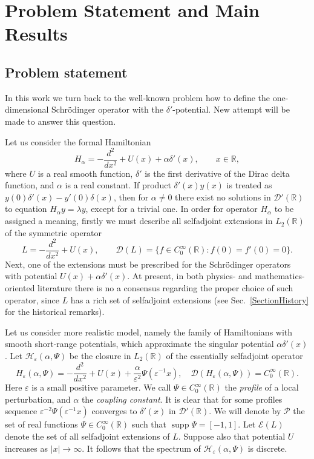 \documentclass[11pt,english]{amsart}%
\DeclareMathOperator{\supp}{supp} \DeclareMathOperator{\sgn}{sgn}
\begin{document}
\section{Problem Statement and Main Results}
\subsection{Problem statement}

In this work we turn back to the well-known problem how to define the one-dimensional Schr\"{o}dinger operator with the $\delta'$-potential. New attempt will be made to answer this question.

Let us consider the formal Hamiltonian
$$H_\alpha=-\frac{d^2}{dx^2}+U(x)+\alpha\delta'(x),\qquad x\in\mathbb R,$$
where $U$ is a real smooth function, $\delta'$ is the first derivative of the Dirac delta function, and $\alpha$ is a real constant. If product $\delta'(x)y(x)$ is treated as  $y(0)\delta'(x)-y'(0)\delta(x)$, then for $\alpha\neq 0$ there exist no solutions in $\mathcal{D}'(\mathbb{R})$ to equation $H_\alpha y=\lambda y$, except for a trivial one.
In order for operator  $H_\alpha$ to be assigned a meaning, firstly we must describe all selfadjoint extensions in
 $L_2(\mathbb{R})$  of the symmetric operator
\begin{equation*}
    L=-\frac{d^2}{dx^2}+U(x),\qquad \mathcal{D}(L)=\{f\in C_0^\infty(\mathbb{R})\colon f(0)=f'(0)=0\}.
\end{equation*}
Next, one of the extensions must be prescribed for the Schr\"{o}dinger operators with potential
$U(x)+\alpha\delta'(x)$.
At present, in both physics- and mathematics-oriented literature there is no a consensus regarding
the pro\-per choice of such operator, since  $L$ has a rich set of selfadjoint extensions (see Sec.~\ref{SectionHistory} for the historical remarks).

Let us consider more realistic model, namely the family of Hamiltonians with smooth short-range potentials, which
approximate the singular potential $\alpha\delta'(x)$. Let
$\mathcal{H}_{\varepsilon}(\alpha,\Psi)$ be the closure in  $L_2(\mathbb{R})$ of the essentially selfadjoint operator \cite[p. 50]{BS}
\begin{equation*}
    H_{\varepsilon}(\alpha, \Psi)=-\frac{d^2}{dx^2}+U(x)+\frac{\alpha}{\varepsilon^{2}}\Psi(\varepsilon^{-1}x), \quad
\mathcal{D}(H_{\varepsilon}(\alpha, \Psi))=C_0^\infty(\mathbb{R}).
\end{equation*}
Here $\varepsilon$ is a small positive parameter. We call $\Psi\in C^\infty_0(\mathbb{R})$ the \emph{profile} of a local perturbation, and  $\alpha$ the \emph{coupling constant}. It is clear that for some profiles  sequence
${\varepsilon^{-2}}\Psi(\varepsilon^{-1}x)$ converges to $\delta'(x)$ in $\mathcal{D}'(\mathbb{R})$.
We will denote by $\mathcal{P}$ the set of real functions $\Psi\in C^\infty_0(\mathbb{R})$ such that $\supp{\Psi}=[-1,1]$. Let $\mathcal{E}(L)$ denote the set of all selfadjoint extensions of $L$.
Suppose also that  potential $U$ increases as $|x|\to \infty$. It follows that the spectrum of $\mathcal{H}_{\varepsilon}(\alpha,\Psi)$ is discrete.
\end{document}
